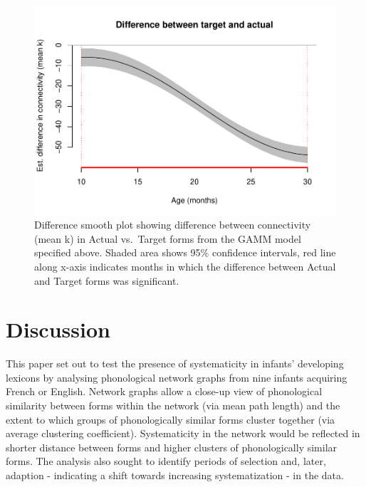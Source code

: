 \documentclass[
  man]{apa6}
\begin{document}
\begin{figure}
\centering
\includegraphics{NetworkGraphs_files/figure-latex/difference-plot-mean-k-1.pdf}
\caption{\label{fig:difference-plot-mean-k}Difference smooth plot showing difference between connectivity (mean k) in Actual vs.~Target forms from the GAMM model specified above. Shaded area shows 95\% confidence intervals, red line along x-axis indicates months in which
the difference between Actual and Target forms was significant.}
\end{figure}

\hypertarget{discussion}{%
\section{Discussion}\label{discussion}}

This paper set out to test the presence of systematicity in infants' developing lexicons by analysing phonological network graphs from nine infants acquiring French or English. Network graphs allow a close-up view of phonological similarity between forms within the network (via mean path length) and the extent to which groups of phonologically similar forms cluster together (via average clustering coefficient). Systematicity in the network would be reflected in shorter distance between forms and higher clusters of phonologically similar forms. The analysis also sought to identify periods of selection and, later, adaption - indicating a shift towards increasing systematization - in the data.
\end{document}
